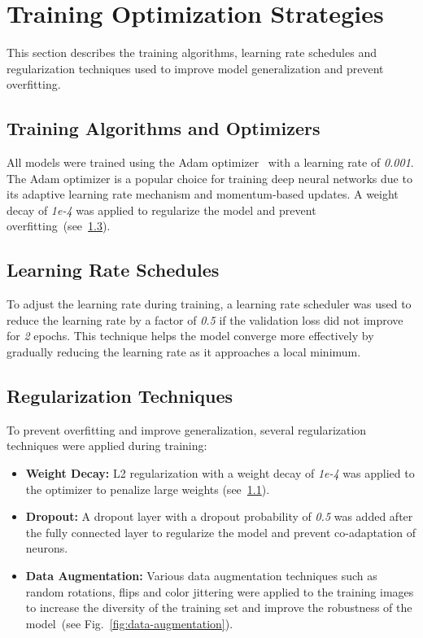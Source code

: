 \section{Training Optimization Strategies}

This section describes the training algorithms, learning rate schedules and regularization techniques used to improve model generalization and prevent overfitting.

\subsection{Training Algorithms and Optimizers}\label{subsec:training-algorithms-optimizers}

All models were trained using the Adam optimizer~\cite{kingma2017adammethodstochasticoptimization} with a learning rate of \textit{0.001}. The Adam optimizer is a popular choice for training deep neural networks due to its adaptive learning rate mechanism and momentum-based updates. A weight decay of \textit{1e-4} was applied to regularize the model and prevent overfitting~(see~\ref{subsec:regularization-techniques}).

\subsection{Learning Rate Schedules}

To adjust the learning rate during training, a learning rate scheduler was used to reduce the learning rate by a factor of \textit{0.5} if the validation loss did not improve for \textit{2} epochs. This technique helps the model converge more effectively by gradually reducing the learning rate as it approaches a local minimum.

\subsection{Regularization Techniques}\label{subsec:regularization-techniques}

To prevent overfitting and improve generalization, several regularization techniques were applied during training:

\begin{itemize}
    \item \textbf{Weight Decay:} L2 regularization with a weight decay of \textit{1e-4} was applied to the optimizer to penalize large weights (see~\ref{subsec:training-algorithms-optimizers}).
    \item \textbf{Dropout:} A dropout layer with a dropout probability of \textit{0.5} was added after the fully connected layer to regularize the model and prevent co-adaptation of neurons.
    \item \textbf{Data Augmentation:} Various data augmentation techniques such as random rotations, flips and color jittering were applied to the training images to increase the diversity of the training set and improve the robustness of the model~(see Fig.~\ref{fig:data-augmentation}).
\end{itemize}

